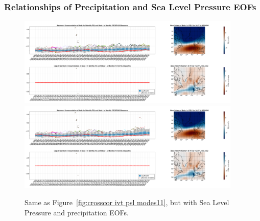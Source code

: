 \subsubsection{Relationships of Precipitation and Sea Level Pressure EOFs}



\begin{figure}
  \begin{center}
    \includegraphics[width=0.95\textwidth]{figures/crosscorrelation_boxplot_psl_pr_modes11_ssp126_50seasons.png}
    \includegraphics[width=0.95\textwidth]{figures/crosscorrelation_boxplot_psl_pr_modes11_ssp585_50seasons.png}
  \end{center}
  \caption{Same as Figure~\ref{fig:crosscor ivt psl modes11}, but with Sea Level Pressure and precipitation EOFs.}\label{fig:crosscor psl pr modes11}
\end{figure}

